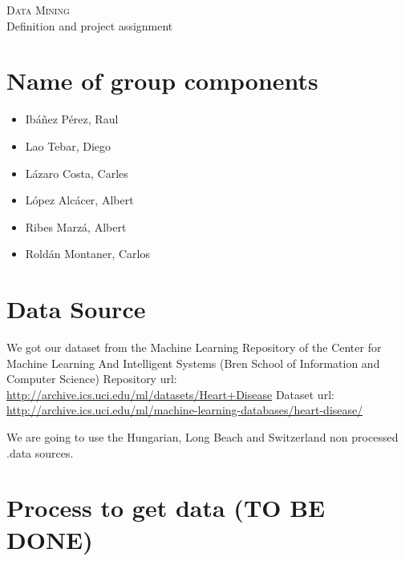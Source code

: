 \documentclass[a4paper,12pt]{article}
\begin{document}
\begin{center}
    \huge{\textsc{Data Mining} \\ Definition and project assignment}
\end{center}


%

\section{Name of group components}

    \begin{itemize}

        \item Ibáñez Pérez, Raul
        \item Lao Tebar, Diego
        \item Lázaro Costa, Carles
        \item López Alcácer, Albert
        \item Ribes Marzá, Albert
        \item Roldán Montaner, Carlos

    \end{itemize}

\section{Data Source}

    We got our dataset from the Machine Learning Repository of the Center for Machine Learning And Intelligent Systems (Bren School of Information and Computer Science)\newline
    Repository url: \url{http://archive.ics.uci.edu/ml/datasets/Heart+Disease}\newline
    Dataset url: \url{http://archive.ics.uci.edu/ml/machine-learning-databases/heart-disease/} \newline

    We are going to use the Hungarian, Long Beach and Switzerland non processed .data sources.

\section{Process to get data (\textbf{TO BE DONE})}
\end{document}
